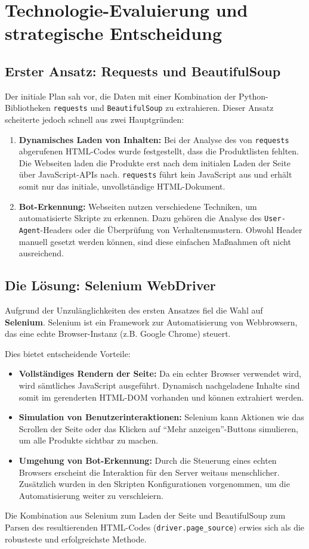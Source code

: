 \section{Technologie-Evaluierung und strategische Entscheidung}
\subsection{Erster Ansatz: Requests und BeautifulSoup}
Der initiale Plan sah vor, die Daten mit einer Kombination der Python-Bibliotheken \texttt{requests} und \texttt{BeautifulSoup} zu extrahieren. Dieser Ansatz scheiterte jedoch schnell aus zwei Hauptgründen:
\begin{enumerate}
    \item \textbf{Dynamisches Laden von Inhalten:} Bei der Analyse des von \texttt{requests} abgerufenen HTML-Codes wurde festgestellt, dass die Produktlisten fehlten. Die Webseiten laden die Produkte erst nach dem initialen Laden der Seite über JavaScript-APIs nach. \texttt{requests} führt kein JavaScript aus und erhält somit nur das initiale, unvollständige HTML-Dokument.
    \item \textbf{Bot-Erkennung:} Webseiten nutzen verschiedene Techniken, um automatisierte Skripte zu erkennen. Dazu gehören die Analyse des \texttt{User-Agent}-Headers oder die Überprüfung von Verhaltensmustern. Obwohl Header manuell gesetzt werden können, sind diese einfachen Maßnahmen oft nicht ausreichend.
\end{enumerate}

\subsection{Die Lösung: Selenium WebDriver}
Aufgrund der Unzulänglichkeiten des ersten Ansatzes fiel die Wahl auf \textbf{Selenium}. Selenium ist ein Framework zur Automatisierung von Webbrowsern, das eine echte Browser-Instanz (z.B. Google Chrome) steuert.

Dies bietet entscheidende Vorteile:
\begin{itemize}
    \item \textbf{Vollständiges Rendern der Seite:} Da ein echter Browser verwendet wird, wird sämtliches JavaScript ausgeführt. Dynamisch nachgeladene Inhalte sind somit im gerenderten HTML-DOM vorhanden und können extrahiert werden.
    \item \textbf{Simulation von Benutzerinteraktionen:} Selenium kann Aktionen wie das Scrollen der Seite oder das Klicken auf "`Mehr anzeigen"'-Buttons simulieren, um alle Produkte sichtbar zu machen.
    \item \textbf{Umgehung von Bot-Erkennung:} Durch die Steuerung eines echten Browsers erscheint die Interaktion für den Server weitaus menschlicher. Zusätzlich wurden in den Skripten Konfigurationen vorgenommen, um die Automatisierung weiter zu verschleiern.
\end{itemize}
Die Kombination aus Selenium zum Laden der Seite und BeautifulSoup zum Parsen des resultierenden HTML-Codes (\texttt{driver.page\_source}) erwies sich als die robusteste und erfolgreichste Methode.

